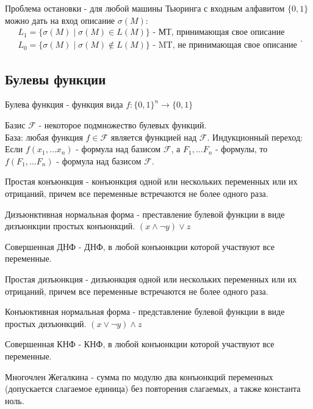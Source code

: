 \documentclass[12pt]{article}
\begin{document}
\begin{defn}
    Проблема остановки - 
    для любой машины Тьюринга с входным алфавитом $\{0, 1\}$ можно дать на вход описание $\sigma (M):$ 
    \[
	\begin{array}{l}
	    L_1 = \{ \sigma (M) \mid \sigma(M) \in L(M) \} \mbox{ - МТ, принимающая свое описание} \\
	    L_0 = \{ \sigma (M) \mid \sigma(M) \notin L(M) \} \mbox{ -  MT, не принимающая свое описание}
     \end{array}
    .\] 
\end{defn}

\subsection{Булевы функции}
\begin{defn}
    Булева функция - функция вида $f: \{0, 1\}^n \to \{0, 1\}$
\end{defn}
\begin{defn}
    Базис $\mathcal{F}$ - некоторое подмножество булевых функций.\\
    База: любая функция $f \in \mathcal{F}$ является функцией над $\mathcal{F}$. Индукционный переход: Если  $f(x_1, \ldots x_n)$ - формула над базисом $\mathcal{F}$, а $F_1, \ldots F_n$ - формулы, то $f(F_1, \ldots F_n)$ - формула над базисом $\mathcal{F}$.
\end{defn}
\begin{defn}
    Простая конъюнкция - конъюнкция одной или нескольких переменных или их отрицаний, причем все переменные встречаются не более одного раза.
\end{defn}
\begin{defn}
    Дизъюнктивная  нормальная форма - преставление булевой функции в виде дизъюнкции простых конъюнкций. $(x \wedge \neg y) \vee z$
\end{defn}
\begin{defn}
    Совершенная ДНФ - ДНФ, в любой конъюнкции которой участвуют все переменные.
\end{defn}
\begin{defn}
    Простая дизъюнкция - дизъюнкция  одной или нескольких переменных или их отрицаний, причем все переменные встречаются не более одного раза.
\end{defn}
\begin{defn}
    Конъюктивная нормальная форма - представление булевой функции в виде простых дизъюнкций. $(x \vee \neg y) \wedge z$
\end{defn}
\begin{defn}
    Совершенная КНФ - КНФ, в любой конъюнкции которой участвуют все переменные.
\end{defn}
\begin{defn}
    Многочлен Жегалкина - сумма по модулю два конъюнкций переменных (допускается слагаемое единица) без повторения слагаемых, а также константа ноль.
\end{defn}
\end{document}
